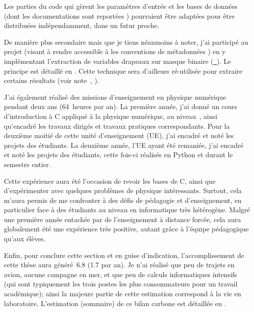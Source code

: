 Les parties du code qui gèrent les paramètres d'entrée et les bases de données (dont les documentations sont reportées ) pourraient être adaptées pour être distribuées indépendamment, dans un futur proche.

De manière plus secondaire mais que je tiens néanmoins à noter, j'ai participé au projet  (visant à rendre accessible à  les conventions de métadonnées ) en y implémentant l'extraction de variables drapeaux sur masque binaire (\href{https://github.com/xarray-contrib/cf-xarray/pull/354}{~}).
Le principe est détaillé en .
Cette technique sera d'ailleurs ré-utilisée pour extraire certains résultats (voir note~,  ).

\bigskip

J'ai également réalisé des missions d'enseignement en physique numérique pendant deux ans (64~heures par an).
La première année, j'ai donné un cours d'introduction à \hbox{C\raisebox{0.5ex}{\scriptsize\textbf{++}}} appliqué à la physique numérique, au niveau~, ainsi qu'encadré les travaux dirigés et travaux pratiques correspondants. Pour la deuxième moitié de cette unité d'enseignement (UE), j'ai encadré et noté les projets des étudiants.
La deuxième année, l'UE ayant été remaniée, j'ai encadré et noté les projets des étudiants, cette fois-ci réalisés en Python et durant le semestre entier.

Cette expérience aura été l'occasion de revoir les bases de \hbox{C\raisebox{0.5ex}{\scriptsize\textbf{++}}}, ainsi que d'expérimenter avec quelques problèmes de physique intéressants.
Surtout, cela m'aura permis de me confronter à des défis de pédagogie et d'enseignement, en particulier face à des étudiants au niveau en informatique très hétérogène.
Malgré une première année entachée par de l'enseignement à distance forcée, cela aura globalement été une expérience très positive, autant grâce à l'équipe pédagogique qu'aux élèves.

\bigskip

Enfin, pour conclure cette section et en guise d'indication, l'accomplissement de cette thèse aura généré~\qty{6.8}{\tcarbone} (\qty{1.7}{\tcarbone} par an).
Je n'ai réalisé que peu de trajets en avion, aucune campagne en mer, et que peu de calculs informatiques intensifs (qui sont typiquement les trois postes les plus consommateurs pour un travail académique); ainsi la majeure partie de cette estimation correspond à la vie en laboratoire.
L'estimation (sommaire) de ce bilan carbone est détaillée en .
